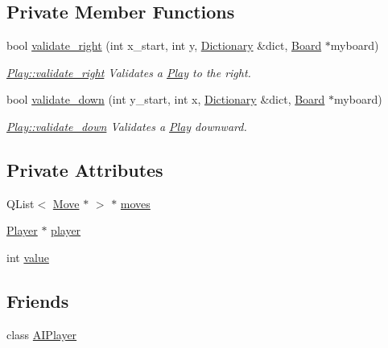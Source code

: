 \subsection*{Private Member Functions}
\begin{DoxyCompactItemize}
\item 
bool \hyperlink{class_play_a6699a989cb202ffc8db61093fea15d1f}{validate\-\_\-right} (int x\-\_\-start, int y, \hyperlink{class_dictionary}{Dictionary} \&dict, \hyperlink{class_board}{Board} $\ast$myboard)
\begin{DoxyCompactList}\small\item\em \hyperlink{class_play_a6699a989cb202ffc8db61093fea15d1f}{Play\-::validate\-\_\-right} Validates a \hyperlink{class_play}{Play} to the right. \end{DoxyCompactList}\item 
bool \hyperlink{class_play_ae7096a77ed85b5251f2faccfb092616b}{validate\-\_\-down} (int y\-\_\-start, int x, \hyperlink{class_dictionary}{Dictionary} \&dict, \hyperlink{class_board}{Board} $\ast$myboard)
\begin{DoxyCompactList}\small\item\em \hyperlink{class_play_ae7096a77ed85b5251f2faccfb092616b}{Play\-::validate\-\_\-down} Validates a \hyperlink{class_play}{Play} downward. \end{DoxyCompactList}\end{DoxyCompactItemize}
\subsection*{Private Attributes}
\begin{DoxyCompactItemize}
\item 
Q\-List$<$ \hyperlink{class_move}{Move} $\ast$ $>$ $\ast$ \hyperlink{class_play_ade35ae53bff24e1755a935899ee018ed}{moves}
\item 
\hyperlink{class_player}{Player} $\ast$ \hyperlink{class_play_a8a7094a8a0186212896fe7daf71617a3}{player}
\item 
int \hyperlink{class_play_abc8cb0f8fb660091fee8563b5a917ad7}{value}
\end{DoxyCompactItemize}
\subsection*{Friends}
\begin{DoxyCompactItemize}
\item 
class \hyperlink{class_play_a2c11a076a909acd936d897cd2a81f931}{A\-I\-Player}
\end{DoxyCompactItemize}


